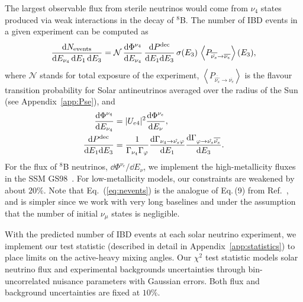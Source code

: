 \documentclass[
reprint,
superscriptaddress,
showpacs,
preprintnumbers,
nofootinbib,
nobibnotes,
amsmath,
amssymb, 
aps,
prd,
floatfix
]{revtex4-1}
\newcommand{\refeq}[1]{Eq.~(\ref{#1})}
\newcommand{\refapp}[1]{Appendix~\ref{#1}}
\renewcommand{\phi}{\varphi}
\begin{document}
The largest observable flux from sterile neutrinos would come from $\nu_4$ states produced via weak interactions in the decay of $^8$B. The number of IBD events in a given experiment can be computed as
%
\begin{align}\label{eq:nevents}
 \frac{\dd N_{\rm events}}{\dd E_{\nu_4} \, \dd E_1 \,\dd E_3} = \mathcal{N} 
 \,\frac{\dd \Phi^{\nu_4}}{\dd E_{\nu_4}}\, \frac{\dd P^{\rm dec} }{\dd E_1 \dd E_3}\,\sigma(E_3) \,\left\langle P_{\overline{\hat{\nu_s}}\to \overline{\nu_e}} \right \rangle(E_3),
\end{align}
%
where $\mathcal{N}$ stands for total exposure of the experiment, $\left\langle P_{\overline{\hat{\nu_s}}\to \overline{\nu_e}} \right \rangle$ is the flavour transition probability for Solar antineutrinos averaged over the radius of the Sun (see \refapp{app:Pse}), and
%
\begin{align}
\frac{\dd \Phi^{\nu_4}}{\dd E_{\nu_4}} & = |U_{e4}|^2 \frac{\dd \Phi^{\nu_e}}{\dd E_\nu},
\\\nonumber
\frac{\dd P^{\rm dec} }{\dd E_1 \dd E_3} & = \frac{1}{\Gamma_{\nu_4} \Gamma_{\phi}} \frac{\dd \Gamma_{\nu_4\to\hat{\nu_s} \phi}}{\dd E_1} \frac{\dd \Gamma_{\phi\to \hat{\nu_s} \overline{\hat{\nu_s}}}}{\dd E_3}.
\end{align}
%
For the flux of $^8$B neutrinos, $\dd \Phi^{\nu_e}/\dd E_\nu$, we implement the high-metallicity fluxes in the SSM GS98~\cite{Vinyoles:2016djt}. For low-metallicity models, our constraints are weakened by about $20\%$.
Note that \refeq{eq:nevents} is the analogue of Eq.\,(9) from Ref.~\cite{Dentler:2019dhz}, and is simpler since we work with very long baselines and under the assumption that the number of initial $\nu_\mu$ states is negligible.

With the predicted number of IBD events at each solar neutrino experiment, we implement our test statistic (described in detail in \refapp{app:statistics}) to place limits on the active-heavy mixing angles. Our $\chi^2$ test statistic models solar neutrino flux and experimental backgrounds uncertainties through bin-uncorrelated nuisance parameters with Gaussian errors. Both flux and background uncertainties are fixed at $10\%$.
\end{document}
